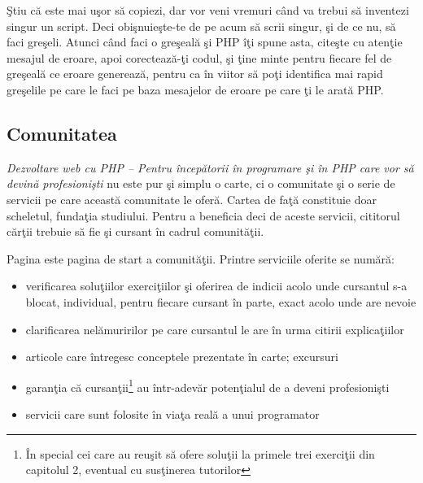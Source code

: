 
Ştiu că este mai uşor să copiezi, dar vor veni vremuri când va
trebui să inventezi singur un script. Deci obişnuieşte-te de
pe acum să scrii singur, şi de ce nu, să faci greşeli. Atunci
când faci o greşeală şi PHP îţi spune asta, citeşte cu atenţie
mesajul de eroare, apoi corectează-ţi codul, şi ţine minte
pentru fiecare fel de greşeală ce eroare generează, pentru ca
în viitor să poţi identifica mai rapid greşelile pe care le faci
pe baza mesajelor de eroare pe care ţi le arată PHP.


{}
\subsection*{Comunitatea}
\textit{Dezvoltare web cu PHP -- Pentru începătorii în programare şi în PHP care vor să devină profesionişti}
nu este pur şi simplu o carte, ci o comunitate şi o serie de servicii pe care
această comunitate le oferă. Cartea de faţă constituie doar scheletul, fundaţia
studiului. Pentru a beneficia deci de aceste servicii, cititorul cărţii
trebuie să fie şi cursant în cadrul comunităţii.

Pagina {\phpro} este pagina de start a comunităţii. Printre serviciile oferite se numără:
\begin{itemize}
	\item verificarea soluţiilor exerciţiilor şi oferirea de indicii acolo unde cursantul s-a blocat, individual,
pentru fiecare cursant în parte, exact acolo unde are nevoie
	\item clarificarea nelămuririlor pe care cursantul le are în urma citirii explicaţiilor
	\item articole care întregesc conceptele prezentate în carte; excursuri
	\item garanţia că cursanţii\footnote{În special cei care au reuşit
să ofere soluţii la primele trei exerciţii din capitolul 2, eventual cu susţinerea
tutorilor} au într-adevăr potenţialul de a deveni profesionişti
	\item servicii care sunt folosite în viaţa reală a unui programator
\end{itemize}

